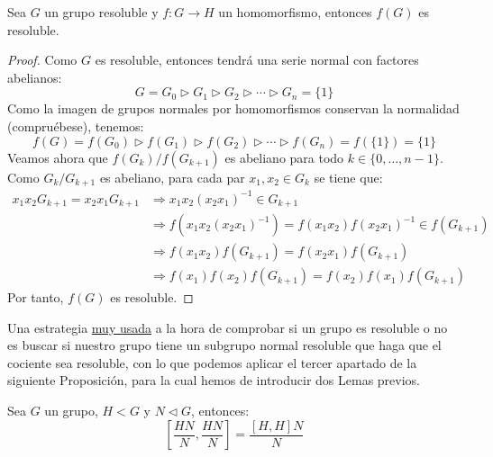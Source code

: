 \begin{prop}\label{prop:homomorfismo_resoluble}
    Sea $G$ un grupo resoluble y $f:G\to H$ un homomorfismo, entonces $f(G)$ es resoluble.
\end{prop}
\begin{proof}
    Como $G$ es resoluble, entonces tendrá una serie normal con factores abelianos:
    \begin{equation*}
        G=G_0 \rhd G_1 \rhd G_2 \rhd \cdots \rhd G_n = \{1\}
    \end{equation*}
    Como la imagen de grupos normales por homomorfismos conservan la normalidad (compruébese), tenemos:
    \begin{equation*}
        f(G)=f(G_0) \rhd f(G_1) \rhd f(G_2) \rhd \cdots \rhd f(G_n) = f(\{1\}) = \{1\}
    \end{equation*}
    Veamos ahora que $f(G_k)/f(G_{k+1})$ es abeliano para todo $k\in\{0,\ldots,n-1\}$. Como $G_k/G_{k+1}$ es abeliano, para cada par $x_1,x_2\in G_k$ se tiene que:
    \begin{align*}
        x_1x_2G_{k+1} = x_2x_1G_{k+1}&\Longrightarrow
        x_1x_2(x_2x_1)^{-1} \in G_{k+1}
        \\&\Longrightarrow
        f(x_1x_2(x_2x_1)^{-1})=f(x_1x_2)f(x_2x_1)^{-1} \in f(G_{k+1})
        \\&\Longrightarrow
        f(x_1x_2)f(G_{k+1}) = f(x_2x_1)f(G_{k+1})
        \\&\Longrightarrow
        f(x_1)f(x_2)f(G_{k+1}) = f(x_2)f(x_1)f(G_{k+1})
    \end{align*}
    Por tanto, $f(G)$ es resoluble.
\end{proof}


\noindent
Una estrategia \underline{muy usada} a la hora de comprobar si un grupo es resoluble o no es buscar si nuestro grupo tiene un subgrupo normal resoluble que haga que el cociente sea resoluble, con lo que podemos aplicar el tercer apartado de la siguiente Proposición, para la cual hemos de introducir dos Lemas previos.

\begin{lema}
    Sea $G$ un grupo, $H<G$ y $N\lhd G$, entonces:
    \begin{equation*}
        \left[\dfrac{HN}{N}, \dfrac{HN}{N}\right] = \dfrac{[H,H]N}{N}
    \end{equation*} %
\end{lema}

